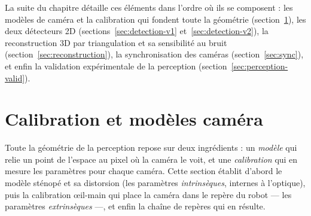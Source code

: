 La suite du chapitre détaille ces éléments dans l'ordre où ils se composent : les modèles de caméra et la calibration qui fondent toute la géométrie (section~\ref{sec:calibration-cam}), les deux détecteurs 2D (sections~\ref{sec:detection-v1} et~\ref{sec:detection-v2}), la reconstruction 3D par triangulation et sa sensibilité au bruit (section~\ref{sec:reconstruction}), la synchronisation des caméras (section~\ref{sec:sync}), et enfin la validation expérimentale de la perception (section~\ref{sec:perception-valid}).

\section{Calibration et modèles caméra}
\label{sec:calibration-cam}

Toute la géométrie de la perception repose sur deux ingrédients : un \emph{modèle} qui relie un point de l'espace au pixel où la caméra le voit, et une \emph{calibration} qui en mesure les paramètres pour chaque caméra. Cette section établit d'abord le modèle sténopé et sa distorsion (les paramètres \emph{intrinsèques}, internes à l'optique), puis la calibration œil-main qui place la caméra dans le repère du robot --- les paramètres \emph{extrinsèques} ---, et enfin la chaîne de repères qui en résulte.

